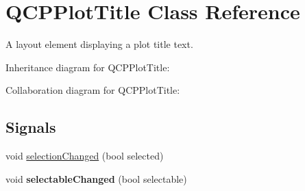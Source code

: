 \hypertarget{class_q_c_p_plot_title}{}\section{Q\+C\+P\+Plot\+Title Class Reference}
\label{class_q_c_p_plot_title}


A layout element displaying a plot title text.  




Inheritance diagram for Q\+C\+P\+Plot\+Title\+:


Collaboration diagram for Q\+C\+P\+Plot\+Title\+:
\subsection*{Signals}
\begin{DoxyCompactItemize}
\item 
void \hyperlink{class_q_c_p_plot_title_a3a01ede2da3b0b5eda33aa5274cc3523}{selection\+Changed} (bool selected)
\item 
void {\bfseries selectable\+Changed} (bool selectable)\hypertarget{class_q_c_p_plot_title_a5eac3c17a4dbabb75250bc1210a83cfc}{}\label{class_q_c_p_plot_title_a5eac3c17a4dbabb75250bc1210a83cfc}

\end{DoxyCompactItemize}

